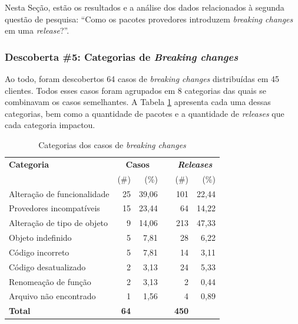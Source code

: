 Nesta Seção, estão os resultados e a análise dos dados relacionados à segunda questão de pesquisa: ``Como os pacotes provedores introduzem \textit{breaking changes} em uma \textit{release}?''.

\subsubsection{Descoberta \#5: Categorias de \textit{Breaking changes}}

Ao todo, foram descobertos 64 casos de \textit{breaking changes} distribuídas em 45 clientes. Todos esses casos foram agrupados em 8 categorias das quais se combinavam os casos semelhantes. A Tabela \ref{tab:bc_category} apresenta cada uma dessas categorias, bem como a quantidade de pacotes e a quantidade de \textit{releases} que cada categoria impactou.

\begin{table}\centering
	\begin{tabular}{lrrrrr} \toprule
		\textbf{Categoria} & \multicolumn{2}{c}{\textbf{Casos}} & \phantom{ab} & \multicolumn{2}{c}{\textit{\textbf{Releases}}}
		\\
		\cmidrule{2-3} \cmidrule{5-6}
		& (\#) & (\%) && (\#) & (\%) \\ \midrule
		Alteração de funcionalidade  & 25              & 39,06 && 101                         & 22,44 \\
		Provedores incompatíveis     & 15              & 23,44 && 64                          & 14,22 \\
		Alteração de tipo de objeto  & 9               & 14,06 && 213                         & 47,33 \\
		Objeto indefinido            & 5               & 7,81  && 28                          & 6,22 \\
		Código incorreto             & 5               & 7,81  && 14                          & 3,11  \\
		Código desatualizado         & 2               & 3,13  && 24                          & 5,33 \\
		Renomeação de função         & 2               & 3,13  && 2                           & 0,44  \\
		Arquivo não encontrado       & 1               & 1,56  && 4                           & 0,89  \\ \hline
		\textbf{Total}               & \textbf{64}     &       && \textbf{450}              &       \\
		\bottomrule
	\end{tabular}
    \caption{Categorias dos casos de \textit{breaking changes}}
    \label{tab:bc_category}
\end{table}

